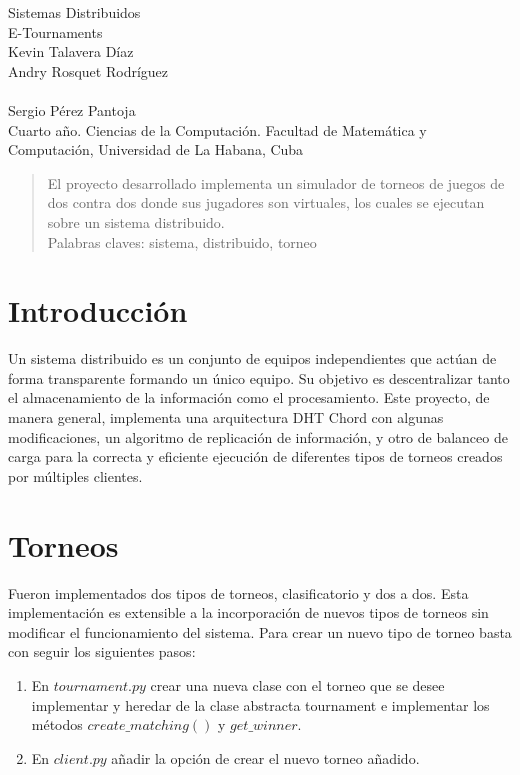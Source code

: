 \documentclass[10pt, a4paper]{article}
\begin{document}
	\begin{center}
		\large{Sistemas Distribuidos} \\
		\huge{E-Tournaments}\\
		\vspace{1em}
		\normalsize Kevin Talavera D\'iaz \\ Andry Rosquet Rodr\'iguez \\ \\ Sergio P\'erez Pantoja\\
		\vspace{1em}
		\small Cuarto a\~no. Ciencias de la Computaci\'on.
		\small Facultad de Matem\'atica y Computaci\'on, Universidad de La Habana, Cuba
	\end{center}

    \begin{abstract}
    	El proyecto desarrollado implementa un simulador de torneos de juegos de dos contra dos donde sus jugadores son virtuales, los cuales se ejecutan sobre un sistema distribuido.\\
    	Palabras claves: sistema, distribuido, torneo 
    \end{abstract}
    \section{Introducci\'on}
    Un sistema distribuido es un conjunto de equipos independientes que act\'uan de forma transparente formando un \'unico equipo. Su objetivo es descentralizar tanto el almacenamiento de la informaci\'on como el procesamiento. Este proyecto, de manera general, implementa una arquitectura DHT Chord con algunas modificaciones, un algoritmo de replicaci\'on de informaci\'on, y otro de balanceo de carga para la correcta y eficiente ejecuci\'on de diferentes tipos de torneos creados por m\'ultiples clientes.
    
    \section{Torneos}
    Fueron implementados dos tipos de torneos, clasificatorio y dos a dos. Esta implementación es extensible a la incorporación de nuevos tipos de torneos sin modificar el funcionamiento del sistema. Para crear un nuevo tipo de torneo basta con seguir los siguientes pasos:\\
    \begin{enumerate}
    	\item En $tournament.py$ crear una nueva clase con el torneo que se desee implementar y heredar de la clase abstracta tournament e implementar los métodos $create\_matching()$ y $get\_winner$.\\
    	\item En $client.py$ añadir la opción de crear el nuevo torneo añadido.\\
    \end{enumerate}
    
\end{document}
